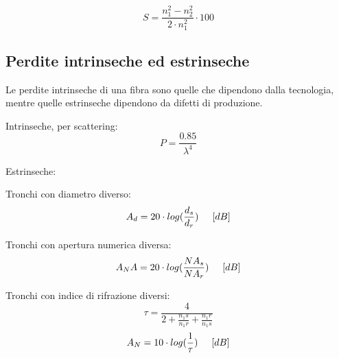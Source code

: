 \documentclass{article}
\begin{document}
    \begin{equation}
        S = \frac{n_1^2 - n_2^2}{2 \cdot n_1^2} \cdot 100
    \end{equation}

    \subsection{Perdite intrinseche ed estrinseche}

    Le perdite intrinseche di una fibra sono quelle che dipendono dalla tecnologia, mentre quelle estrinseche dipendono da
    difetti di produzione.

    Intrinseche, per scattering:
    \begin{equation}
        P = \frac{0.85}{\lambda ^ 4}
    \end{equation}

    Estrinseche:

    Tronchi con diametro diverso:
    \begin{equation}
        A_d = 20 \cdot log(\frac{d_s}{d_r}) \hspace{0.5cm} [dB]
    \end{equation}

    Tronchi con apertura numerica diversa:
    \begin{equation}
        A_NA = 20 \cdot log(\frac{NA_s}{NA_r}) \hspace{0.5cm} [dB]
    \end{equation}

    Tronchi con indice di rifrazione diversi:
    \begin{equation}
        \tau = \frac{4}{
            2 + \frac{n_1s}{n_1r} + \frac{n_1r}{n_1s}
        }
    \end{equation}
    \begin{equation}
        A_N = 10 \cdot log(\frac{1}{\tau}) \hspace{0.5cm} [dB]
    \end{equation}
\end{document}
